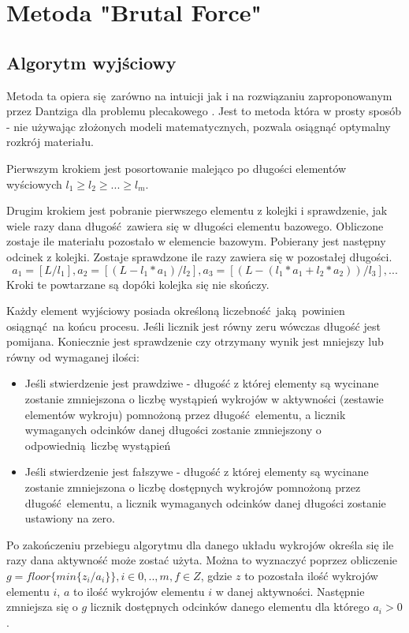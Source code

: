 \section{Metoda "Brutal Force"}
\subsection{Algorytm wyjściowy}
Metoda ta opiera się zarówno na intuicji jak i na rozwiązaniu zaproponowanym przez Dantziga dla problemu plecakowego \cite{DantzigArticle}. Jest to metoda która w prosty sposób - nie używając złożonych modeli matematycznych, pozwala osiągnąć optymalny rozkrój materiału.

Pierwszym krokiem jest posortowanie malejąco po długości elementów wyściowych $l_1 \ge l_2 \ge ... \ge l_m$.

Drugim krokiem jest pobranie pierwszego elementu z kolejki i sprawdzenie, jak wiele razy dana długość zawiera się w długości elementu bazowego. Obliczone zostaje ile materiału pozostało w elemencie bazowym. Pobierany jest następny odcinek z kolejki. Zostaje sprawdzone ile razy zawiera się w pozostałej długości.
\begin{equation}\label{base_dantizg}
a_1 = [L/l_1], a_2 = [(L-l_1*a_1)/l_2], a_3 = [(L-(l_1*a_1+l_2*a_2))/l_3], ...
\end{equation}
Kroki te powtarzane są dopóki kolejka się nie skończy.

Każdy element wyjściowy posiada określoną liczebność jaką powinien osiągnąć na końcu procesu. Jeśli licznik jest równy zeru wówczas długość jest pomijana. Koniecznie jest sprawdzenie czy otrzymany wynik jest mniejszy lub równy od wymaganej ilości:
\begin{itemize}
  \item Jeśli stwierdzenie jest prawdziwe - długość z której elementy są wycinane zostanie zmniejszona o liczbę wystąpień wykrojów w aktywności (zestawie elementów wykroju) pomnożoną przez długość elementu, a licznik wymaganych odcinków danej długości zostanie zmniejszony o odpowiednią liczbę wystąpień
  \item Jeśli stwierdzenie jest fałszywe - długość z której elementy są wycinane zostanie zmniejszona o liczbę dostępnych wykrojów pomnożoną przez długość elementu, a licznik wymaganych odcinków danej długości zostanie ustawiony na zero.
\end{itemize}
Po zakończeniu przebiegu algorytmu dla danego układu wykrojów określa się ile razy dana aktywność może zostać użyta. Można to wyznaczyć poprzez obliczenie $g = floor\{min\{z_i/a_i\}\}, i \in {0,..,m}, f \in Z$, gdzie $z$ to pozostała ilość wykrojów elementu $i$, $a$ to ilość wykrojów elementu $i$ w danej aktywności. Następnie zmniejsza się o $g$ licznik dostępnych odcinków danego elementu dla którego $a_i > 0$.

